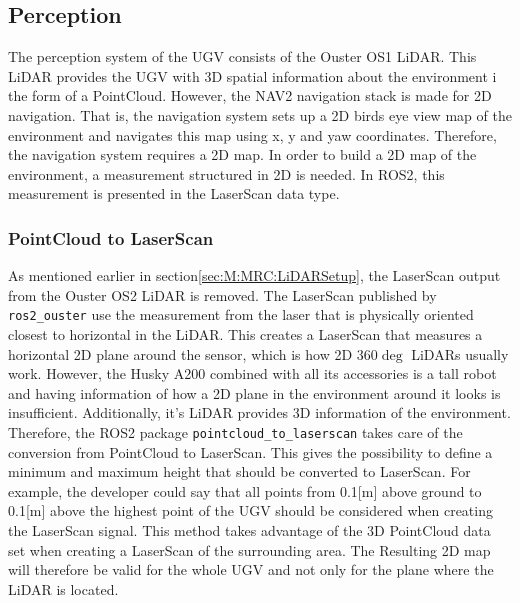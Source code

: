 \subsection{Perception}\label{sec:M:AN:Perception}
The perception system of the UGV consists of the Ouster OS1 LiDAR. This LiDAR provides the UGV with 3D spatial information about the environment i the form of a PointCloud. However, the NAV2 navigation stack is made for 2D navigation. That is, the navigation system sets up a 2D birds eye view map of the environment and navigates this map using x, y and yaw coordinates. Therefore, the navigation system requires a 2D map.
In order to build a 2D map of the environment, a measurement structured in 2D is needed. In ROS2, this measurement is presented in the LaserScan data type.

\subsubsection{PointCloud to LaserScan} \label{sec:M:AN:P:PointCloudToLaserScan}
As mentioned earlier in section\ref{sec:M:MRC:LiDARSetup}, the LaserScan output from the Ouster OS2 LiDAR is removed. The LaserScan published by \lstinline{ros2_ouster} use the measurement from the laser that is physically oriented closest to horizontal in the LiDAR. This creates a LaserScan that measures a horizontal 2D plane around the sensor, which is how 2D $360\deg$ LiDARs usually work. However, the Husky A200 combined with all its accessories is a tall robot and having information of how a 2D plane in the environment around it looks is insufficient. Additionally, it's LiDAR provides 3D information of the environment. Therefore, the ROS2 package \lstinline{pointcloud_to_laserscan} takes care of the conversion from PointCloud to LaserScan. This gives the possibility to define a minimum and maximum height that should be converted to LaserScan. For example, the developer could say that all points from 0.1[m] above ground to 0.1[m] above the highest point of the UGV should be considered when creating the LaserScan signal. This method takes advantage of the 3D PointCloud data set when creating a LaserScan of the surrounding area. The Resulting 2D map will therefore be valid for the whole UGV and not only for the plane where the LiDAR is located.


